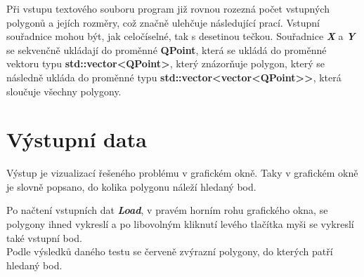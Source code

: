 \documentclass{article}
\begin{document}
Při vstupu textového souboru program již rovnou rozezná počet vstupných polygonů a jejích rozměry, což značně ulehčuje následující prací. Vstupní souřadnice mohou být, jak celočíselné, tak s desetinou tečkou. Souřadnice \textit{\textbf {X}} a \textit{\textbf {Y}} se sekvenčně ukládají do 
proměnné \textbf {QPoint}, která se ukládá do proměnné vektoru typu  \textbf {std::vector<QPoint>}, který znázorňuje polygon, který  se následně ukláda do proměnné typu  \textbf {std::vector<vector<QPoint>}\textbf {>}, která sloučuje všechny polygony. 


\section{Výstupní data}
	Výstup je vizualizací řešeného problému v grafickém okně. Taky v grafickém okně je slovně popsano, do kolika polygonu náleží hledaný bod.\\ 
\bigskip 

Po načtení vstupních dat \textit{\textbf {Load}}, v pravém horním rohu grafického 
okna, se polygony ihned vykreslí a po libovolným kliknutí levého tlačítka myši se vykreslí také vstupní 
bod.\\ 
Podle výsledků daného testu se červeně zvýrazní polygony, do kterých patří hledaný bod.
\clearpage
\end{document}
